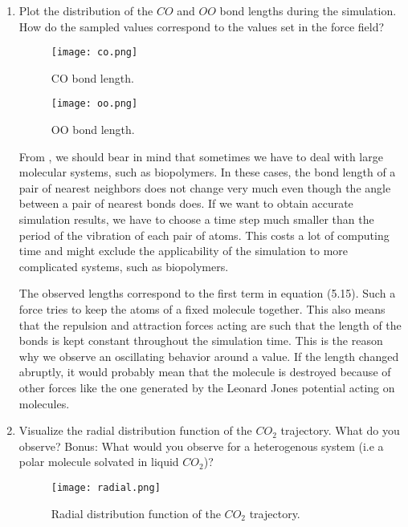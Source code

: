 \documentclass[12pt,letterpaper]{report}
\begin{document}
  \begin{enumerate}
  	\item 
	Plot the distribution of the $CO$ and $OO$ bond lengths during the simulation. How do the sampled values correspond to the values set in the force field?
	
	\begin{figure}[H]
		\centering
		\texttt{[image: co.png]}		
		\caption{CO bond length.}
		\label{fig::co_bound}
	\end{figure}  

	\begin{figure}[H]
		\centering
		\texttt{[image: oo.png]}		
		\caption{OO bond length.}
		\label{fig::oo_bound}
	\end{figure}
	
	From \cite{pang_2006}, we should bear in mind that sometimes we have to deal with large molecular systems, such as biopolymers. In these cases, the bond length of a pair of nearest neighbors does not change very much even though the angle between a pair of nearest bonds does.
	If we want to obtain accurate simulation results, we have to choose a time step	much smaller than the period of the vibration of each pair of atoms. This costs	a lot of computing time and might exclude the applicability of the simulation to more complicated systems, such as biopolymers.
	
	The observed lengths correspond to the first term in equation (5.15). Such a force tries to keep the atoms of a fixed molecule together. This also means that the repulsion and attraction forces acting are such that the length of the bonds is kept constant throughout the simulation time. This is the reason why we observe an oscillating behavior around a value. If the length changed abruptly, it would probably mean that the molecule is destroyed because of other forces like the one generated by the Leonard Jones potential acting on molecules. 
	
  	\item 
  	Visualize the radial distribution function of the $CO_2$ trajectory. What do you observe? Bonus: What would you observe for a heterogenous system (i.e a polar molecule solvated in liquid $CO_2$)?

	\begin{figure}[H]
	\centering
	\texttt{[image: radial.png]}		
	\caption{Radial distribution function of the $CO_2$ trajectory.}
	\label{fig::radial}
	\end{figure}	
		

\end{enumerate}
\end{document}
